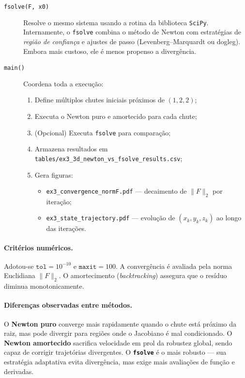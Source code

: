 \documentclass[12pt,a4paper]{article}
\begin{document}
\begin{description}
  \item[\texttt{fsolve(F, x0)}]
  Resolve o mesmo sistema usando a rotina da biblioteca \texttt{SciPy}.
  Internamente, o \texttt{fsolve} combina o método de Newton com estratégias de \emph{região de confiança} e ajustes de passo (Levenberg–Marquardt ou dogleg). 
  Embora mais custoso, ele é menos propenso a divergência.

  \item[\texttt{main()}]
  Coordena toda a execução:
  \begin{enumerate}
    \item Define múltiplos chutes iniciais próximos de $(1,2,2)$;
    \item Executa o Newton puro e amortecido para cada chute;
    \item (Opcional) Executa \texttt{fsolve} para comparação;
    \item Armazena resultados em \texttt{tables/ex3\_3d\_newton\_vs\_fsolve\_results.csv};
    \item Gera figuras:
      \begin{itemize}
        \item \texttt{ex3\_convergence\_normF.pdf} — decaimento de $\|F\|_2$ por iteração;
        \item \texttt{ex3\_state\_trajectory.pdf} — evolução de $(x_k,y_k,z_k)$ ao longo das iterações.
      \end{itemize}
  \end{enumerate}
\end{description}

\paragraph{Critérios numéricos.}
Adotou-se \(\texttt{tol}=10^{-10}\) e \(\texttt{maxit}=100\).
A convergência é avaliada pela norma Euclidiana \(\|F\|_2\).
O amortecimento (\emph{backtracking}) assegura que o resíduo diminua monotonicamente.

\paragraph{Diferenças observadas entre métodos.}
O \textbf{Newton puro} converge mais rapidamente quando o chute está próximo da raiz, mas pode divergir para regiões onde o Jacobiano é mal condicionado.
O \textbf{Newton amortecido} sacrifica velocidade em prol da robustez global, sendo capaz de corrigir trajetórias divergentes.
O \textbf{\texttt{fsolve}} é o mais robusto — sua estratégia adaptativa evita divergência, mas exige mais avaliações de função e derivadas.
\end{document}
